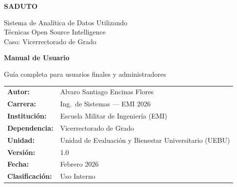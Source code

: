 \documentclass[12pt,a4paper]{article}
\begin{document}
\begin{titlepage}
\centering
\vspace*{2cm}

{\Huge\bfseries\color{emiblue}SADUTO\par}
\vspace{0.3cm}
{\large\color{emidark}Sistema de Analítica de Datos Utilizando\\Técnicas Open Source Intelligence\\Caso: Vicerrectorado de Grado\par}

\vspace{1cm}
\noindent\makebox[\textwidth]{\color{emiblue}\rule{0.6\textwidth}{2pt}}
\vspace{1cm}

{\LARGE\bfseries Manual de Usuario\par}
\vspace{0.3cm}
{\large Guía completa para usuarios finales y administradores\par}

\vfill

\begin{tabular}{ll}
\textbf{Autor:}         & Alvaro Santiago Encinas Flores \\
\textbf{Carrera:}       & Ing.\ de Sistemas — EMI 2026 \\
\textbf{Institución:}   & Escuela Militar de Ingeniería (EMI) \\
\textbf{Dependencia:}   & Vicerrectorado de Grado \\
\textbf{Unidad:}        & Unidad de Evaluación y Bienestar Universitario (UEBU) \\
\textbf{Versión:}       & 1.0 \\
\textbf{Fecha:}         & Febrero 2026 \\
\textbf{Clasificación:} & Uso Interno \\
\end{tabular}

\vspace{1cm}
\noindent\makebox[\textwidth]{\color{emiyellow}\rule{0.4\textwidth}{3pt}}
\end{titlepage}

\tableofcontents
\newpage

\end{document}
